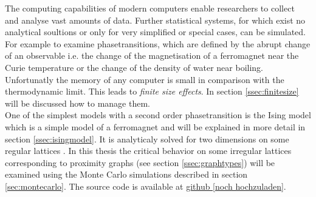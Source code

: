The computing capabilities of modern computers enable researchers to
collect and analyse vast amounts of data.
Further statistical systems, for which exist no analytical soultions
or only for very simplified or special cases, can be simulated.
For example to examine phasetransitions, which are defined by the abrupt
change of an observable i.e. the change of the magnetisation of a
ferromagnet near the Curie temperature or the change of the density of
water near boiling. Unfortunatly the memory of any computer is small in
comparison with the thermodynamic limit.
This leads to \emph{finite size effects}. In section \ref{ssec:finitesize}
will be discussed how to manage them.\\

One of the simplest models with a second order phasetransition is the
Ising model \cite{Ising1925} which is a simple model of a ferromagnet
and will be explained in more detail in section \ref{ssec:isingmodel}.
It is analyticaly solved for two dimensions on some regular lattices
\cite{Onsager1944} \cite{Wannier1945}.
In this thesis the critical behavior on some irregular lattices
corresponding to proximity graphs (see section \ref{ssec:graphtypes})
will be examined using the Monte Carlo simulations described in section
\ref{sec:montecarlo}. The source code is available at
\url{github [noch hochzuladen]}.
